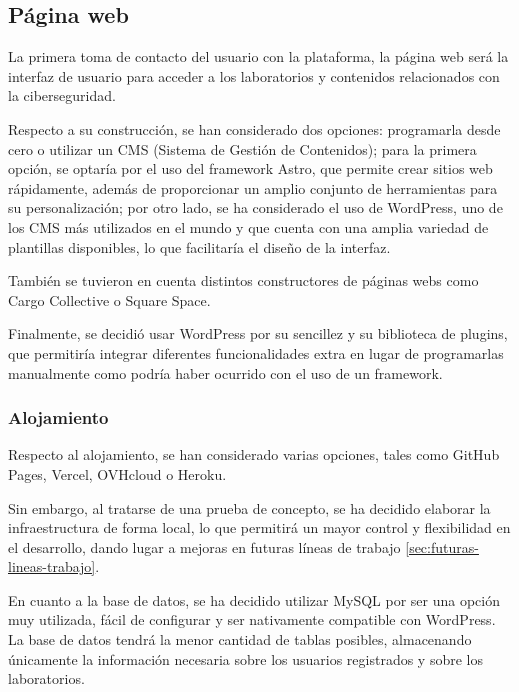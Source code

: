         \subsection{Página web}
        
            La primera toma de contacto del usuario con la plataforma, la página web será la interfaz de usuario para acceder a los laboratorios y contenidos relacionados con la ciberseguridad.
            
            Respecto a su construcción, se han considerado dos opciones: programarla desde cero o utilizar un CMS (Sistema de Gestión de Contenidos); para la primera opción, se optaría por el uso del framework Astro, que permite crear sitios web rápidamente, además de proporcionar un amplio conjunto de herramientas para su personalización; por otro lado, se ha considerado el uso de WordPress, uno de los CMS más utilizados en el mundo y que cuenta con una amplia variedad de plantillas disponibles, lo que facilitaría el diseño de la interfaz.

            También se tuvieron en cuenta distintos constructores de páginas webs como Cargo Collective o Square Space.

            Finalmente, se decidió usar WordPress por su sencillez y su biblioteca de plugins, que permitiría integrar diferentes funcionalidades extra en lugar de programarlas manualmente como podría haber ocurrido con el uso de un framework.
                
            \subsubsection{Alojamiento}
            
                Respecto al alojamiento, se han considerado varias opciones, tales como GitHub Pages, Vercel, OVHcloud o Heroku.
                
                Sin embargo, al tratarse de una prueba de concepto, se ha decidido elaborar la infraestructura de forma local, lo que permitirá un mayor control y flexibilidad en el desarrollo, dando lugar a mejoras en futuras líneas de trabajo \ref{sec:futuras-lineas-trabajo}.

                En cuanto a la base de datos, se ha decidido utilizar MySQL por ser una opción muy utilizada, fácil de configurar y ser nativamente compatible con WordPress. La base de datos tendrá la menor cantidad de tablas posibles, almacenando únicamente la información necesaria sobre los usuarios registrados y sobre los laboratorios.
            
